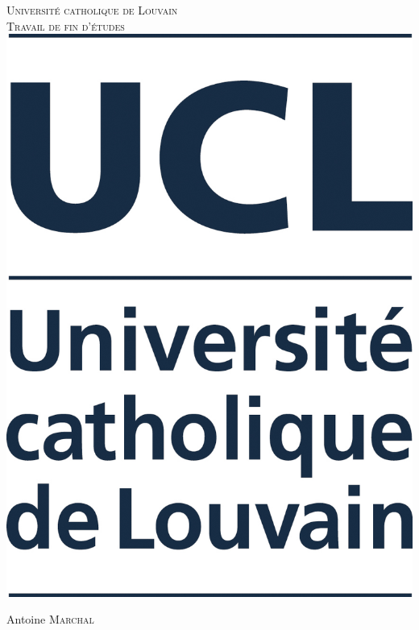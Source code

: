 \documentclass[a4paper,12pt,french]{report}
\begin{document}
\begin{titlepage}
\center

\textsc{\LARGE Université catholique de Louvain}\\[1.5cm]
\textsc{\Large Travail de fin d'études}\\[2cm]

\includegraphics[scale=.15]{UCL_mention_pantone282.jpg}\\[1.5cm]

\begin{minipage}{0.4\textwidth}
\begin{center}
\Large Antoine \textsc{Marchal}
\end{center}
\end{minipage}\\[5.5cm]


\end{titlepage}
\end{document}

